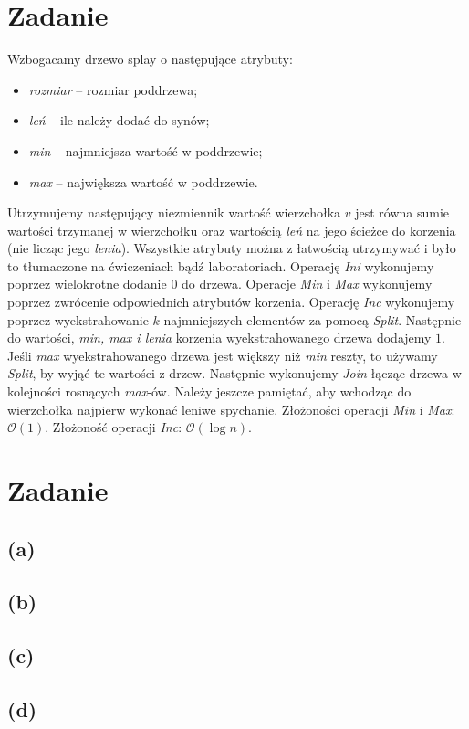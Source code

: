 \documentclass[12pt, a4paper]{article}
\newcommand{\MCALO}{\mathcal{O}}
\newcounter{zadanie}
\newcommand{\zadanie}{\addtocounter{zadanie}{1}\section*{Zadanie \arabic{zadanie}}}
\begin{document}
\zadanie{}
Wzbogacamy drzewo splay o następujące atrybuty:
\begin{itemize}
\item \textit{rozmiar} -- rozmiar poddrzewa;
\item \textit{leń} -- ile należy dodać do synów;
\item \textit{min} -- najmniejsza wartość w poddrzewie;
\item \textit{max} -- największa wartość w poddrzewie.
\end{itemize}
Utrzymujemy następujący niezmiennik wartość wierzchołka $v$ jest równa sumie
wartości trzymanej w wierzchołku oraz wartością \textit{leń} na jego ścieżce do
korzenia (nie licząc jego \textit{lenia}). Wszystkie atrybuty można z łatwością
utrzymywać i było to tłumaczone na ćwiczeniach bądź laboratoriach. Operację
\textit{Ini} wykonujemy poprzez wielokrotne dodanie $0$ do drzewa. Operacje
\textit{Min} i \textit{Max} wykonujemy poprzez zwrócenie odpowiednich atrybutów
korzenia. Operację \textit{Inc} wykonujemy poprzez wyekstrahowanie $k$
najmniejszych elementów za pomocą \textit{Split}. Następnie do wartości,
\textit{min, max i lenia} korzenia wyekstrahowanego drzewa dodajemy $1$. Jeśli
\textit{max} wyekstrahowanego drzewa jest większy niż \textit{min} reszty, to
używamy \textit{Split}, by wyjąć te wartości z drzew. Następnie wykonujemy
\textit{Join} łącząc drzewa w kolejności rosnących \textit{max}-ów. Należy
jeszcze pamiętać, aby wchodząc do wierzchołka najpierw wykonać leniwe
spychanie. Złożoności operacji \textit{Min} i \textit{Max}: $\MCALO(1)$.
Złożoność operacji \textit{Inc}: $\MCALO(\log{n})$.

\zadanie{}
\subsection*{(a)}
\subsection*{(b)}
\subsection*{(c)}
\subsection*{(d)}
\end{document}
